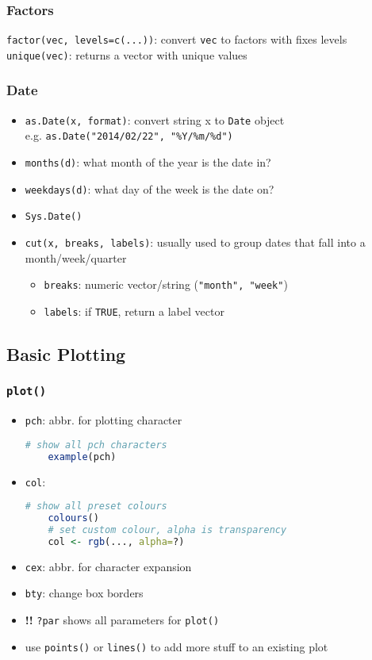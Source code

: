 \documentclass{article}
\begin{document}
\begin{multicols}{2}
\subsubsection*{Factors}
\texttt{factor(vec, levels=c(...))}: convert \texttt{vec} to factors with fixes levels\\
\texttt{unique(vec)}: returns a vector with unique values

\subsubsection*{Date}
\begin{itemize}
	\item \texttt{as.Date(x, format)}: convert string x to \texttt{Date} object \\ e.g. \texttt{as.Date("2014/02/22", "\%Y/\%m/\%d")}
	\item \texttt{months(d)}: what month of the year is the date in?
	\item \texttt{weekdays(d)}: what day of the week is the date on?
	\item \texttt{Sys.Date()}
	\item \texttt{cut(x, breaks, labels)}: usually used to group dates that fall into a month/week/quarter
	\begin{itemize}
		\item \texttt{breaks}: numeric vector/string (\texttt{"month", "week"})
		\item \texttt{labels}: if \texttt{TRUE}, return a label vector
	\end{itemize}

\end{itemize}

\subsection*{Basic Plotting}
\subsubsection*{\texttt{plot()}}
\begin{itemize}
	\item \texttt{pch}: abbr. for plotting character
	\begin{lstlisting}[language=R]
	# show all pch characters
	example(pch)\end{lstlisting}
	\item \texttt{col}:
	\begin{lstlisting}[language=R]
	# show all preset colours
	colours()
	# set custom colour, alpha is transparency
	col <- rgb(..., alpha=?)\end{lstlisting}
	\item \texttt{cex}: abbr. for character expansion
	\item \texttt{bty}: change box borders
	\item \textbf{!!} \texttt{?par} shows all parameters for \texttt{plot()}
	\item use \texttt{points()} or \texttt{lines()} to add more stuff to an existing plot


\end{itemize}
\end{multicols}
\end{document}
